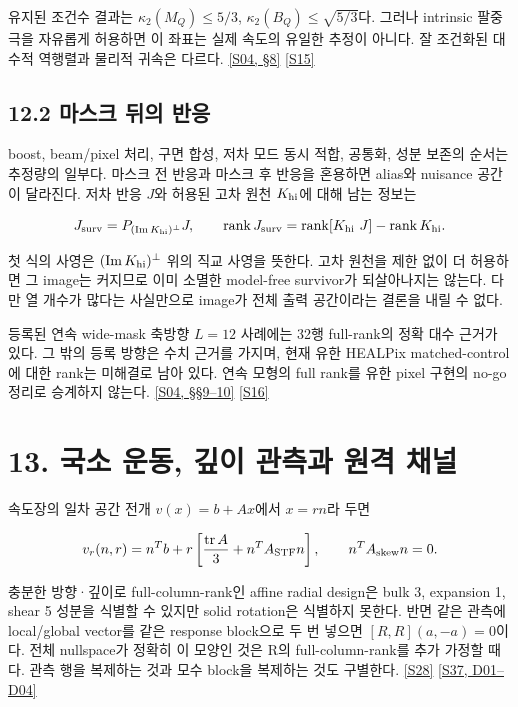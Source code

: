 \documentclass[11pt,a4paper]{article}
\begin{document}
유지된 조건수 결과는 \(\kappa_2(M_Q)\le5/3\), \(\kappa_2(B_Q)\le\sqrt{5/3}\)다. 그러나 intrinsic 팔중극을 자유롭게 허용하면 이 좌표는 실제 속도의 유일한 추정이 아니다. 잘 조건화된 대수적 역행렬과 물리적 귀속은 다르다. \hyperlink{src:S04}{[S04, §8]} \hyperlink{src:S15}{[S15]}


\subsection*{12.2 마스크 뒤의 반응}

boost, beam/pixel 처리, 구면 합성, 저차 모드 동시 적합, 공통화, 성분 보존의 순서는 추정량의 일부다. 마스크 전 반응과 마스크 후 반응을 혼용하면 alias와 nuisance 공간이 달라진다. 저차 반응 \(J\)와 허용된 고차 원천 \(K_{\rm hi}\)에 대해 남는 정보는


\[
J_{\rm surv}=P_{(\operatorname{Im}K_{\rm hi})^{\perp}}J,
\qquad
\operatorname{rank}J_{\rm surv}
=\operatorname{rank}[K_{\rm hi}\ J]-\operatorname{rank}K_{\rm hi}.
\]

첫 식의 사영은 \((\operatorname{Im}K_{\rm hi})^\perp\) 위의 직교 사영을 뜻한다. 고차 원천을 제한 없이 더 허용하면 그 image는 커지므로 이미 소멸한 model-free survivor가 되살아나지는 않는다. 다만 열 개수가 많다는 사실만으로 image가 전체 출력 공간이라는 결론을 내릴 수 없다.


등록된 연속 wide-mask 축방향 \(L=12\) 사례에는 32행 full-rank의 정확 대수 근거가 있다. 그 밖의 등록 방향은 수치 근거를 가지며, 현재 유한 HEALPix matched-control에 대한 rank는 미해결로 남아 있다. 연속 모형의 full rank를 유한 pixel 구현의 no-go 정리로 승계하지 않는다. \hyperlink{src:S04}{[S04, §§9–10]} \hyperlink{src:S16}{[S16]}


\hypertarget{s13}{}

\section*{13. 국소 운동, 깊이 관측과 원격 채널}


속도장의 일차 공간 전개 \(v(x)=b+Ax\)에서 \(x=rn\)라 두면


\[
v_r(n,r)=n^Tb+r\left[\frac{\operatorname{tr}A}{3}
+n^T A_{\rm STF}n\right],\qquad n^TA_{\rm skew}n=0.
\]

충분한 방향·깊이로 full-column-rank인 affine radial design은 bulk 3, expansion 1, shear 5 성분을 식별할 수 있지만 solid rotation은 식별하지 못한다. 반면 같은 관측에 local/global vector를 같은 response block으로 두 번 넣으면 \([R,R](a,-a)=0\)이다. 전체 nullspace가 정확히 이 모양인 것은 R의 full-column-rank를 추가 가정할 때다. 관측 행을 복제하는 것과 모수 block을 복제하는 것도 구별한다. \hyperlink{src:S28}{[S28]} \hyperlink{src:S37}{[S37, D01–D04]}
\end{document}

